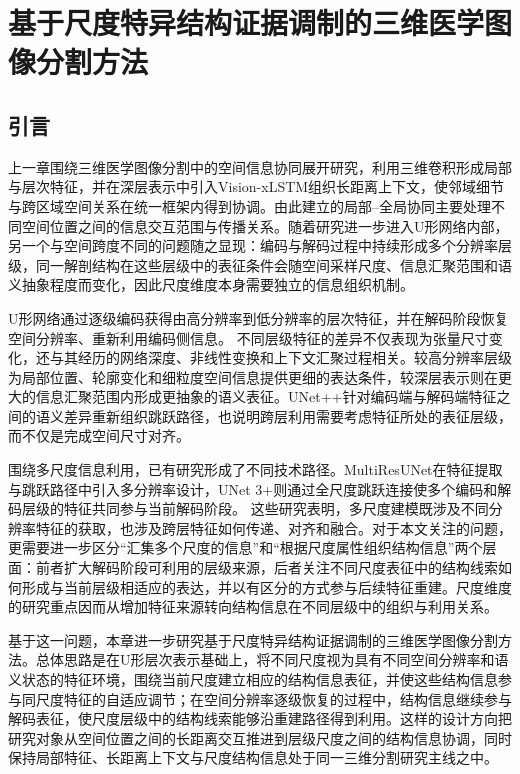 \chapter{基于尺度特异结构证据调制的三维医学图像分割方法}


\section{引言}

上一章围绕三维医学图像分割中的空间信息协同展开研究，利用三维卷积形成局部与层次特征，并在深层表示中引入Vision-xLSTM组织长距离上下文，使邻域细节与跨区域空间关系在统一框架内得到协调。由此建立的局部--全局协同主要处理不同空间位置之间的信息交互范围与传播关系。随着研究进一步进入U形网络内部，另一个与空间跨度不同的问题随之显现：编码与解码过程中持续形成多个分辨率层级，同一解剖结构在这些层级中的表征条件会随空间采样尺度、信息汇聚范围和语义抽象程度而变化，因此尺度维度本身需要独立的信息组织机制。

U形网络通过逐级编码获得由高分辨率到低分辨率的层次特征，并在解码阶段恢复空间分辨率、重新利用编码侧信息。\cite{ronneberger2015unet} 不同层级特征的差异不仅表现为张量尺寸变化，还与其经历的网络深度、非线性变换和上下文汇聚过程相关。较高分辨率层级为局部位置、轮廓变化和细粒度空间信息提供更细的表达条件，较深层表示则在更大的信息汇聚范围内形成更抽象的语义表征。UNet++针对编码端与解码端特征之间的语义差异重新组织跳跃路径，也说明跨层利用需要考虑特征所处的表征层级，而不仅是完成空间尺寸对齐。\cite{zhou2018unetpp}

围绕多尺度信息利用，已有研究形成了不同技术路径。MultiResUNet在特征提取与跳跃路径中引入多分辨率设计，UNet 3+则通过全尺度跳跃连接使多个编码和解码层级的特征共同参与当前解码阶段。\cite{ibtehaz2020multiresunet,huang2020unet3plus} 这些研究表明，多尺度建模既涉及不同分辨率特征的获取，也涉及跨层特征如何传递、对齐和融合。对于本文关注的问题，更需要进一步区分“汇集多个尺度的信息”和“根据尺度属性组织结构信息”两个层面：前者扩大解码阶段可利用的层级来源，后者关注不同尺度表征中的结构线索如何形成与当前层级相适应的表达，并以有区分的方式参与后续特征重建。尺度维度的研究重点因而从增加特征来源转向结构信息在不同层级中的组织与利用关系。

基于这一问题，本章进一步研究基于尺度特异结构证据调制的三维医学图像分割方法。总体思路是在U形层次表示基础上，将不同尺度视为具有不同空间分辨率和语义状态的特征环境，围绕当前尺度建立相应的结构信息表征，并使这些结构信息参与同尺度特征的自适应调节；在空间分辨率逐级恢复的过程中，结构信息继续参与解码表征，使尺度层级中的结构线索能够沿重建路径得到利用。这样的设计方向把研究对象从空间位置之间的长距离交互推进到层级尺度之间的结构信息协调，同时保持局部特征、长距离上下文与尺度结构信息处于同一三维分割研究主线之中。

